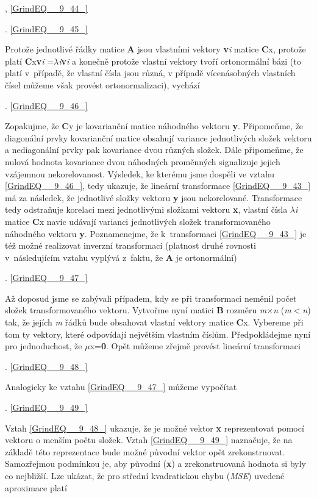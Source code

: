  , \eqref{GrindEQ__9_44_}

 . \eqref{GrindEQ__9_45_}

\noindent Protože jednotlivé řádky matice \textbf{A} jsou vlastními vektory \textbf{v}\textit{i} matice \textbf{C}x, protože platí \textbf{C}x\textbf{v}\textit{i} =$\lambda$\textit{i}\textbf{v}\textit{i} a konečně protože vlastní vektory tvoří ortonormální bázi (to platí v~případě, že vlastní čísla jsou různá, v případě vícenásobných vlastních čísel můžeme však provést ortonormalizaci), vychází

 . \eqref{GrindEQ__9_46_}

\noindent Zopakujme, že \textbf{C}y je kovarianční matice náhodného vektoru \textbf{y}. Připomeňme, že diagonální prvky kovarianční matice obsahují variance jednotlivých složek vektoru a nediagonální prvky pak kovariance dvou různých složek. Dále připomeňme, že nulová hodnota kovariance dvou náhodných proměnných signalizuje jejich vzájemnou nekorelovanost. Výsledek, ke kterému jsme dospěli ve vztahu \eqref{GrindEQ__9_46_}, tedy ukazuje, že lineární transformace \eqref{GrindEQ__9_43_} má za následek, že jednotlivé složky vektoru \textbf{y} jsou nekorelované. Transformace tedy odstraňuje korelaci mezi jednotlivými složkami vektoru \textbf{x}, vlastní čísla $\lambda$\textit{i} matice \textbf{C}x navíc udávají varianci jednotlivých složek transformovaného náhodného vektoru \textbf{y}. Poznamenejme, že k~transformaci \eqref{GrindEQ__9_43_} je též možné realizovat inverzní transformaci (platnost druhé rovnosti v~následujícím vztahu vyplývá z~faktu, že \textbf{A} je ortonormální)

 . \eqref{GrindEQ__9_47_}

\noindent Až doposud jsme se zabývali případem, kdy se při transformaci neměnil počet složek transformovaného vektoru. Vytvořme nyní matici \textbf{B} rozměru \textit{m}$\times$\textit{n} (\textit{m}$<$\textit{n}) tak, že jejích \textit{m} řádků bude obsahovat vlastní vektory matice \textbf{C}x. Vybereme při tom ty vektory, které odpovídají největším vlastním číslům. Předpokládejme nyní pro jednoduchost, že \textbf{$\mu$}x=\textbf{0}. Opět můžeme zřejmě provést lineární transformaci

 . \eqref{GrindEQ__9_48_}

\noindent Analogicky ke vztahu \eqref{GrindEQ__9_47_} můžeme vypočítat

 . \eqref{GrindEQ__9_49_}

\noindent Vztah \eqref{GrindEQ__9_48_} ukazuje, že je možné vektor \textbf{x} reprezentovat pomocí vektoru o menším počtu složek. Vztah \eqref{GrindEQ__9_49_} naznačuje, že na základě této reprezentace bude možné původní vektor opět zrekonstruovat. Samozřejmou podmínkou je, aby původní (\textbf{x}) a zrekonstruovaná  hodnota si byly co nejbližší. Lze ukázat, že pro střední kvadratickou chybu (\textit{MSE}) uvedené aproximace platí

